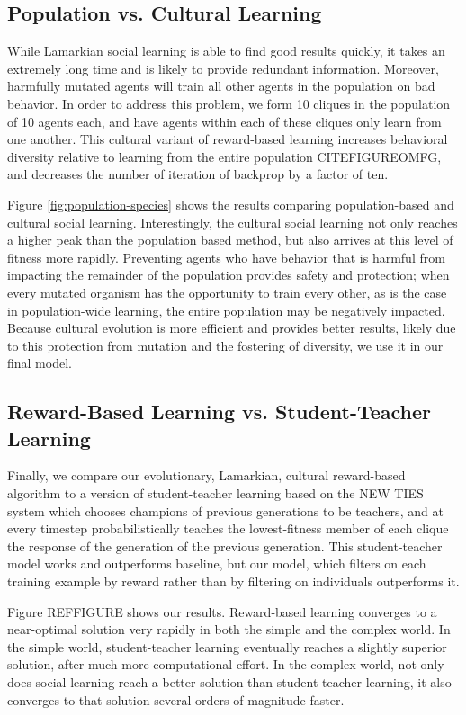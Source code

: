 \documentclass{acm_proc_article-sp}
\begin{document}
\subsection*{Population vs. Cultural Learning}
While Lamarkian social learning is able to find good results quickly, it takes an extremely long time and is likely to provide redundant information.  Moreover, harmfully mutated agents will train all other agents in the population on bad behavior.  In order to address this problem, we form 10 cliques in the population of 10 agents each, and have agents within each of these cliques only learn from one another.  This cultural variant of reward-based learning increases behavioral diversity relative to learning from the entire population CITEFIGUREOMFG, and   decreases the number of iteration of backprop by a factor of ten.

Figure \ref{fig:population-species} shows the results comparing population-based and cultural social learning. Interestingly, the cultural social learning not only reaches a higher peak than the population based method, but also arrives at this level of fitness more rapidly.  Preventing agents who have behavior that is harmful from impacting the remainder of the population provides safety and protection; when every mutated organism has the opportunity to train every other, as is the case in population-wide learning, the entire population may be negatively impacted.  Because cultural evolution is more efficient and provides better results, likely due to this protection from mutation and the fostering of diversity, we use it in our final model.


\subsection*{Reward-Based Learning vs. Student-Teacher Learning}
Finally, we compare our evolutionary, Lamarkian, cultural reward-based algorithm to a version of student-teacher learning based on the NEW TIES system \cite{haasdijk2008social} which chooses champions of previous generations to be teachers, and at every timestep probabilistically teaches the lowest-fitness member of each clique the response of the generation of the previous generation.  This student-teacher model works and outperforms baseline, but our model, which filters on each training example by reward rather than by filtering on individuals outperforms it.

Figure REFFIGURE shows our results.  Reward-based learning converges to a near-optimal solution very rapidly in both the simple and the complex world.  In the simple world, student-teacher learning eventually reaches a slightly superior solution, after much more computational effort.  In the complex world, not only does social learning reach a better solution than student-teacher learning, it also converges to that solution several orders of magnitude faster.  
\end{document}
